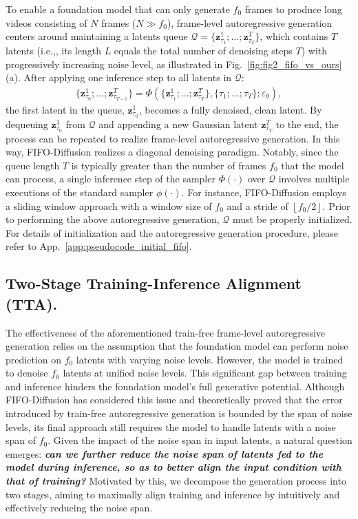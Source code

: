 \documentclass{llmxive}
\providecommand{\ie}{i.e.,\xspace}
\begin{document}
To enable a foundation model that can only generate $f_0$ frames to produce long videos consisting of $N$ frames ($N \gg f_0$), frame-level autoregressive generation centers around maintaining a latents queue $\mathcal{Q} = \{\mathbf{z}_{\tau_1}^1;\ldots; \mathbf{z}_{\tau_T}^T\}$, which contains $T$ latents (\ie, its length $L$ equals the total number of denoising steps $T$) with progressively increasing noise level, as illustrated in Fig.~\ref{fig:fig2_fifo_vs_ours} (a). 
After applying one inference step to all latents in $\mathcal{Q}$:
\begin{align}
  \{\mathbf{z}_{\tau_0}^1;\ldots; \mathbf{z}_{\tau_{T-1}}^T\} = \Phi(\{\mathbf{z}_{\tau_1}^1;\ldots; \mathbf{z}_{\tau_T}^T\}, \{\tau_1;\ldots;\tau_T\}; \varepsilon_\theta),
  \label{eq:fifo_infer}
\end{align}
the first latent in the queue, $\mathbf{z}^1_{\tau_0}$, becomes a fully denoised, clean latent. By dequeuing $\mathbf{z}^1_{\tau_0}$ from $\mathcal{Q}$ and appending a new Gaussian latent $\mathbf{z}^T_{\tau_T}$ to the end, the process can be repeated to realize frame-level autoregressive generation. 
In this way, FIFO-Diffusion realizes a diagonal denoising paradigm.
Notably, since the queue length $T$ is typically greater than the number of frames $f_0$ that the model can process, a single inference step of the sampler $\Phi(\cdot)$ over $\mathcal{Q}$ involves multiple executions of the standard sampler $\phi(\cdot)$.
For instance, FIFO-Diffusion employs a sliding window approach with a window size of $f_0$ and a stride of $\left\lfloor f_0 / 2 \right\rfloor$.
Prior to performing the above autoregressive generation, $\mathcal{Q}$ must be properly initialized.
For details of initialization and the autoregressive generation procedure, please refer to App.~\ref{app:pseudocode_initial_fifo}.



\subsection{Two-Stage Training-Inference Alignment (TTA).}
\label{sec_3_2}

The effectiveness of the aforementioned train-free frame-level autoregressive generation relies on the assumption that the foundation model can perform noise prediction on $f_0$ latents with varying noise levels. However, the model is trained to denoise $f_0$ latents at unified noise levels. 
This significant gap between training and inference hinders the foundation model's full generative potential.
Although FIFO-Diffusion \cite{kim2024fifo} has considered this issue and theoretically proved that the error introduced by train-free autoregressive generation is bounded by the span of noise levels, its final approach still requires the model to handle latents with a noise span of $f_0$.
Given the impact of the noise span in input latents, a natural question emerges: \textit{\textbf{can we further reduce the noise span of latents fed to the model during inference, so as to better align the input condition with that of training?}}
Motivated by this, we decompose the generation process into two stages, aiming to maximally align training and inference by intuitively and effectively reducing the noise span.
\end{document}
